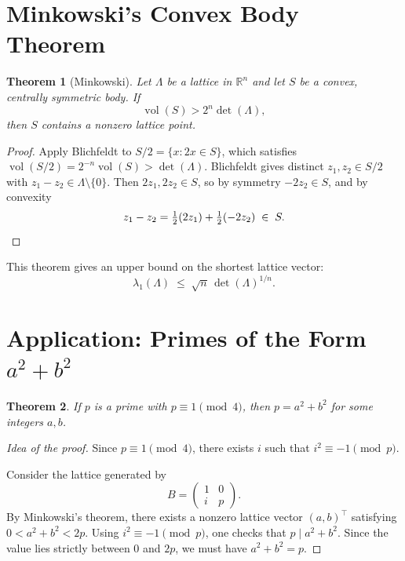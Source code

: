 \documentclass[11pt]{article}
\theoremstyle{plain}
\newtheorem{theorem}{Theorem}[section]
\theoremstyle{definition}
\newcommand{\R}{\mathbb{R}}
\newcommand{\vol}{\operatorname{vol}}
\begin{document}
\section{Minkowski's Convex Body Theorem}

\begin{theorem}[Minkowski]
Let $\Lambda$ be a lattice in $\R^n$ and let $S$ be a convex, centrally symmetric body. If
\[
  \vol(S) > 2^n \det(\Lambda),
\]
then $S$ contains a nonzero lattice point.
\end{theorem}

\begin{proof}
Apply Blichfeldt to $S/2 = \{x : 2x \in S\}$, which satisfies $\vol(S/2) = 2^{-n}\vol(S) > \det(\Lambda)$.
Blichfeldt gives distinct $z_1, z_2 \in S/2$ with $z_1 - z_2 \in \Lambda \setminus \{0\}$.
Then $2z_1, 2z_2 \in S$, so by symmetry $-2z_2 \in S$, and by convexity
\[
  z_1 - z_2 = \tfrac{1}{2}(2z_1) + \tfrac{1}{2}(-2z_2) \;\in\; S. \qedhere
\]
\end{proof}

This theorem gives an upper bound on the shortest lattice vector:
\[
  \lambda_1(\Lambda) \;\le\; \sqrt{n}\,\det(\Lambda)^{1/n}.
\]

\section{Application: Primes of the Form $a^2 + b^2$}

\begin{theorem}
If $p$ is a prime with $p \equiv 1 \pmod{4}$, then $p = a^2 + b^2$ for some integers $a, b$.
\end{theorem}

\begin{proof}[Idea of the proof]
Since $p \equiv 1 \pmod{4}$, there exists $i$ such that $i^2 \equiv -1 \pmod{p}$.

Consider the lattice generated by
\[
  B = \begin{pmatrix} 1 & 0 \\ i & p \end{pmatrix}.
\]
By Minkowski's theorem, there exists a nonzero lattice vector $(a,b)^\top$ satisfying $0 < a^2 + b^2 < 2p$.
Using $i^2 \equiv -1 \pmod{p}$, one checks that $p \mid a^2 + b^2$. Since the value lies strictly between $0$ and $2p$, we must have $a^2 + b^2 = p$.
\end{proof}
\end{document}
